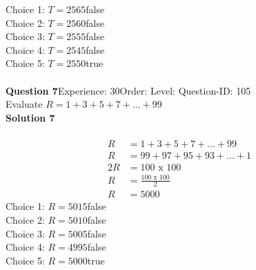 \documentclass{article}
\begin{document}
Choice 1: \hspace{20pt}$T=2565$\hspace{20pt}false\\
Choice 2: \hspace{20pt}$T=2560$\hspace{20pt}false\\
Choice 3: \hspace{20pt}$T=2555$\hspace{20pt}false\\
Choice 4: \hspace{20pt}$T=2545$\hspace{20pt}false\\
Choice 5: \hspace{20pt}$T=2550$\hspace{20pt}true\\
\\[4pt]
\noindent\textbf{Question 7}\hspace{20pt}Experience: 30\hspace{20pt}Order: \hspace{20pt}Level: \hspace{20pt}Question-ID: 105\\[2pt]
Evaluate $R=1+3+5+7+...+99$\\[4pt]
\noindent\textbf{Solution 7}\\[2pt]
\\[-35pt]\begin{align*}
R&=1+3+5+7+...+99\\[2pt]
R&=99+97+95+93+...+1\\[2pt]
2R&=100\,\,\text{x}\,\,100\\[2pt]
R&=\displaystyle\frac{100\,\,\text{x}\,\,100}{2}\\[2pt]
R&=5000
\end{align*}
Choice 1: \hspace{20pt}$R=5015$\hspace{20pt}false\\
Choice 2: \hspace{20pt}$R=5010$\hspace{20pt}false\\
Choice 3: \hspace{20pt}$R=5005$\hspace{20pt}false\\
Choice 4: \hspace{20pt}$R=4995$\hspace{20pt}false\\
Choice 5: \hspace{20pt}$R=5000$\hspace{20pt}true\\
\end{document}
